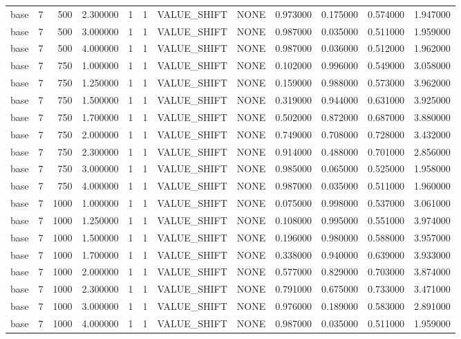 \begin{tabular}{lrrrllllrrrr}
base & 7 & 500 & 2.300000 & 1 & 1 & VALUE_SHIFT & NONE & 0.973000 & 0.175000 & 0.574000 & 1.947000 \\
base & 7 & 500 & 3.000000 & 1 & 1 & VALUE_SHIFT & NONE & 0.987000 & 0.035000 & 0.511000 & 1.959000 \\
base & 7 & 500 & 4.000000 & 1 & 1 & VALUE_SHIFT & NONE & 0.987000 & 0.036000 & 0.512000 & 1.962000 \\
base & 7 & 750 & 1.000000 & 1 & 1 & VALUE_SHIFT & NONE & 0.102000 & 0.996000 & 0.549000 & 3.058000 \\
base & 7 & 750 & 1.250000 & 1 & 1 & VALUE_SHIFT & NONE & 0.159000 & 0.988000 & 0.573000 & 3.962000 \\
base & 7 & 750 & 1.500000 & 1 & 1 & VALUE_SHIFT & NONE & 0.319000 & 0.944000 & 0.631000 & 3.925000 \\
base & 7 & 750 & 1.700000 & 1 & 1 & VALUE_SHIFT & NONE & 0.502000 & 0.872000 & 0.687000 & 3.880000 \\
base & 7 & 750 & 2.000000 & 1 & 1 & VALUE_SHIFT & NONE & 0.749000 & 0.708000 & 0.728000 & 3.432000 \\
base & 7 & 750 & 2.300000 & 1 & 1 & VALUE_SHIFT & NONE & 0.914000 & 0.488000 & 0.701000 & 2.856000 \\
base & 7 & 750 & 3.000000 & 1 & 1 & VALUE_SHIFT & NONE & 0.985000 & 0.065000 & 0.525000 & 1.958000 \\
base & 7 & 750 & 4.000000 & 1 & 1 & VALUE_SHIFT & NONE & 0.987000 & 0.035000 & 0.511000 & 1.960000 \\
base & 7 & 1000 & 1.000000 & 1 & 1 & VALUE_SHIFT & NONE & 0.075000 & 0.998000 & 0.537000 & 3.061000 \\
base & 7 & 1000 & 1.250000 & 1 & 1 & VALUE_SHIFT & NONE & 0.108000 & 0.995000 & 0.551000 & 3.974000 \\
base & 7 & 1000 & 1.500000 & 1 & 1 & VALUE_SHIFT & NONE & 0.196000 & 0.980000 & 0.588000 & 3.957000 \\
base & 7 & 1000 & 1.700000 & 1 & 1 & VALUE_SHIFT & NONE & 0.338000 & 0.940000 & 0.639000 & 3.933000 \\
base & 7 & 1000 & 2.000000 & 1 & 1 & VALUE_SHIFT & NONE & 0.577000 & 0.829000 & 0.703000 & 3.874000 \\
base & 7 & 1000 & 2.300000 & 1 & 1 & VALUE_SHIFT & NONE & 0.791000 & 0.675000 & 0.733000 & 3.471000 \\
base & 7 & 1000 & 3.000000 & 1 & 1 & VALUE_SHIFT & NONE & 0.976000 & 0.189000 & 0.583000 & 2.891000 \\
base & 7 & 1000 & 4.000000 & 1 & 1 & VALUE_SHIFT & NONE & 0.987000 & 0.035000 & 0.511000 & 1.959000 \\

\end{tabular}
